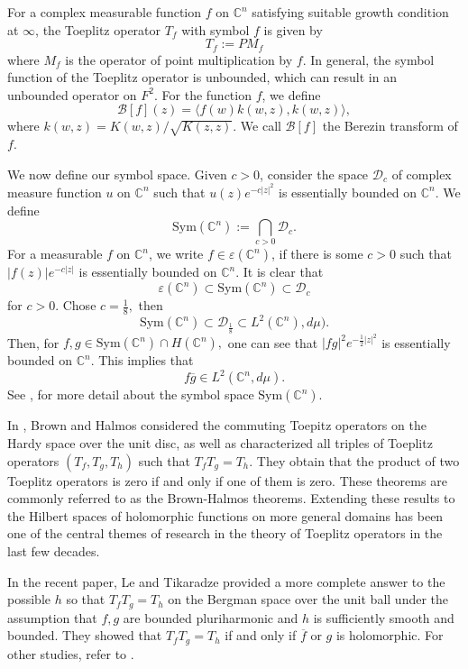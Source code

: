 \documentclass[11pt,reqno]{amsart}
\theoremstyle{definition}
\begin{document}
For a complex measurable function $f$ on $\mathbb{C}^n$ satisfying suitable growth condition at $\infty$, the Toeplitz operator $T_f$ with symbol $f$ is given by
$$T_f:=PM_f$$
where $M_f$ is the operator of point multiplication by $f$. In general, the symbol function of the Toeplitz operator is unbounded, which can result in an unbounded operator on $F^2$. For the function $f$, we define  $$\mathcal{B}[f](z)=\langle f(w)k(w,z),k(w,z)\rangle,$$
where $k(w,z)=K(w,z)/\sqrt{K(z,z)}.$  We call $\mathcal{B}[f]$ the Berezin transform of $f.$

We now define our symbol space. Given $c>0$, consider the space $\mathcal{D}_c$ of complex measure function $u$ on $\mathbb{C}^n$ such that $u(z)e^{-c|z|^2}$ is essentially bounded on $\mathbb{C}^n$. We define
$$\text{Sym}(\mathbb{C}^n):=\bigcap_{c>0} \mathcal{D}_c.$$  For a measurable  $f$ on $\mathbb{C}^n$, we  write $f\in \varepsilon(\mathbb{C}^n)$, if there is some $c>0$ such that $|f(z)|e^{-c|z|}$ is essentially bounded on $\mathbb{C}^n$. It is clear that
$$\varepsilon(\mathbb{C}^n)\subset \text{Sym}(\mathbb{C}^n)\subset \mathcal{D}_c$$
for $c>0.$  Chose $c=\frac{1}{8},$ then
$$\text{Sym}(\mathbb{C}^n)\subset \mathcal{D}_{\frac{1}{8}}\subset L^{2}(\mathbb{C}^n),d\mu).$$
 Then, for $f,g\in \text{Sym}(\mathbb{C}^n)\cap H(\mathbb{C}^n),$ one can see that  $|fg|^2e^{-\frac{1}{2}|z|^2}$ is essentially bounded on $\mathbb{C}^n$. This implies that
 \begin{equation}\label{E14}
 f\overline{g}\in L^{2}(\mathbb{C}^n,d\mu).
 \end{equation}
See \cite{Bauer1}, for more detail about the symbol space $\text{Sym}(\mathbb{C}^n)$.

In \cite{Brown}, Brown and Halmos considered the commuting Toepitz operators on the Hardy space over the unit disc, as well as characterized all triples of Toeplitz operators $(T_f,T_g,T_h)$ such that $T_fT_g=T_h$. They obtain that the product of two Toeplitz operators is zero if and only if one of them is zero. These theorems are commonly referred to as the Brown-Halmos theorems. Extending these results to the Hilbert spaces of holomorphic functions on more general domains has been one of the central themes of research in the theory of Toeplitz operators in the last few decades.

In the recent paper, Le and Tikaradze \cite{Le} provided a more complete answer to the possible $h$ so that $T_fT_g=T_h$ on the Bergman space over the unit ball under the assumption that $f,g$ are bounded  pluriharmonic and $h$ is sufficiently smooth and bounded. They showed that $T_fT_g=T_h$ if and only if $\overline{f}$ or $g$ is holomorphic. For other studies, refer to \cite{Ahern,Aleman,Axler,Choe,Choe1,Choe2,Choe3,Ding,Guo,Le,Zheng}.
\end{document}
